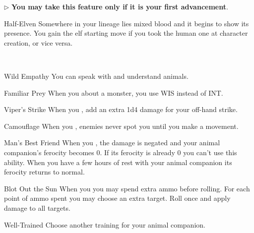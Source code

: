 \documentclass[8pt]{extarticle}
\begin{document}
\begin{multicols}{2}
  $\triangleright$ \textbf{You may take this feature only if it is
    your first advancement}.

  \begin{optfeature}{Half-Elven}
    Somewhere in your lineage lies mixed blood and it begins to show
    its presence. You gain the elf starting move if you took the human
    one at character creation, or vice versa.
  \end{optfeature}

  \

  \firstAdvances

\begin{amove}{Wild Empathy}
  You can speak with and understand animals.
\end{amove}

\begin{amove}{Familiar Prey}
  When you  about a monster, you use WIS instead of
  INT.
\end{amove}

\begin{amove}{Viper’s Strike}
  When you , add
  an extra 1d4 damage for your off-hand strike.
\end{amove}

\begin{amove}{Camouflage}
  When you , enemies
  never spot you until you make a movement.
\end{amove}

\begin{amove}{Man’s Best Friend}
  When you , the damage is negated and your animal
  companion’s ferocity becomes 0. If its ferocity is already 0 you
  can’t use this ability. When you have a few hours of rest with your
  animal companion its ferocity returns to normal.
\end{amove}

\begin{amove}{Blot Out the Sun}
  When you  you may spend extra ammo before rolling. For
  each point of ammo spent you may choose an extra target. Roll once
  and apply damage to all targets.
\end{amove}

\begin{amove}{Well-Trained}
  Choose another training for your animal companion.
\end{amove}


\end{multicols}
\end{document}
